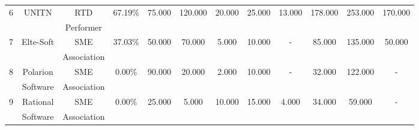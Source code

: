 \begin{center}
\begin{adjustbox}{width=1\textwidth}
\begin{tabular}{ |c|c|c|c|c|c|c|c|c|c|c|c|}
			6 & UNITN & RTD & 67.19\% & 75.000 & 120.000 & 20.000 & 25.000 & 13.000 & 178.000 & 253.000 & 170.000 \\
			~ & ~ & Performer & ~ & ~ & ~ & ~ & ~ & ~ & ~ & ~ & \\
			\hline
			
			7 & Elte-Soft & SME & 37.03\% & 50.000 & 70.000 & 5.000 & 10.000 & - & 85.000 & 135.000 & 50.000 \\
			~ & ~ & Association & ~ & ~ & ~ & ~ & ~ & ~ & ~ & ~ & \\
			\hline
			
			8 & Polarion & SME & 0.00\% & 90.000 & 20.000 & 2.000 & 10.000 & - & 32.000 & 122.000 & - \\
			~ & Software & Association & ~ & ~ & ~ & ~ & ~ & ~ & ~ & ~ & \\
			\hline
			
			9 & Rational & SME & 0.00\% & 25.000 & 5.000 & 10.000 & 15.000 & 4.000 & 34.000 & 59.000 & - \\
			~ & Software & Association & ~ & ~ & ~ & ~ & ~ & ~ & ~ & ~ & \\
			\hline
		\end{tabular}
	\end{adjustbox}
\end{center}